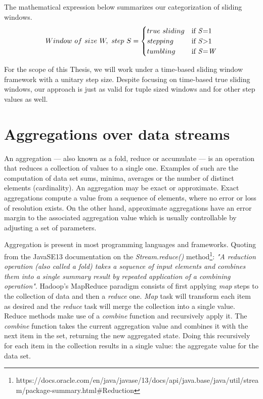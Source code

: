 The mathematical expression below summarizes our categorization of sliding windows.
\begin{equation} 
  Window \,\, of \,\, size \,\, W, \,\, step \,\, S =
    \begin{cases}
      true \,\, sliding & \text{if \textit{S}=1}\\
      stepping & \text{if \textit{S}>1}\\
      tumbling & \text{if \textit{S}=\textit{W}}
    \end{cases}
\end{equation}

For the scope of this Thesis, we will work under a time-based sliding window framework with a unitary step size. Despite focusing on time-based true sliding windows, our approach is just as valid for tuple sized windows and for other step values as well.

\section{Aggregations over data streams} \label{sec:aggregations}

An aggregation --- also known as a fold, reduce or accumulate --- is an operation that reduces a collection of values to a single one. Examples of such are the computation of data set sums, minima, averages or the number of distinct elements (cardinality). An aggregation may be exact or approximate. Exact aggregations compute a value from a sequence of elements, where no error or loss of resolution exists. On the other hand, approximate aggregations have an error margin to the associated aggregation value which is usually controllable by adjusting a set of parameters.

Aggregation is present in most programming languages and frameworks. Quoting from the JavaSE13 documentation on the \textit{Stream.reduce()} method\footnote{https://docs.oracle.com/en/java/javase/13/docs/api/java.base/java/util/stream/package-summary.html\#Reduction}: \textit{"A reduction operation (also called a fold) takes a sequence of input elements and combines them into a single summary result by repeated application of a combining operation"}. Hadoop's MapReduce paradigm consists of first applying \textit{map} steps to the collection of data and then a \textit{reduce} one. \textit{Map} task will transform each item as desired and the \textit{reduce} task will merge the collection into a single value. Reduce methods make use of a \textit{combine} function and recursively apply it. The \textit{combine} function takes the current aggregation value and combines it with the next item in the set, returning the new aggregated state. Doing this recursively for each item in the collection results in a single value: the aggregate value for the data set.

